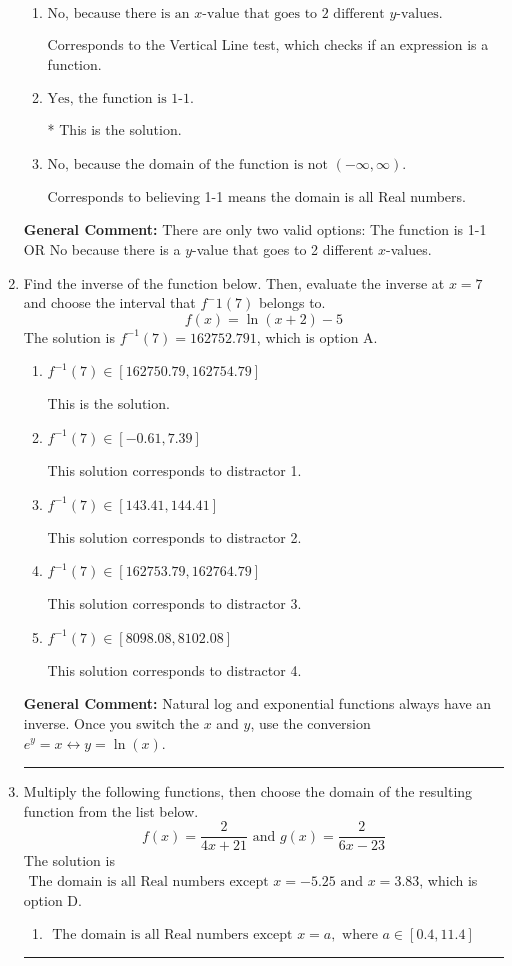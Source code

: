 \documentclass{extbook}[14pt]
\newcommand{\litem}[1]{\item #1

\rule{\textwidth}{0.4pt}}
\begin{document}
\begin{enumerate}
{\begin{enumerate}[label=\Alph*.]
Corresponds to the Horizontal Line test, which this function passes.
\item \( \text{No, because there is an $x$-value that goes to 2 different $y$-values.} \)

Corresponds to the Vertical Line test, which checks if an expression is a function.
\item \( \text{Yes, the function is 1-1.} \)

* This is the solution.
\item \( \text{No, because the domain of the function is not $(-\infty, \infty)$.} \)

Corresponds to believing 1-1 means the domain is all Real numbers.
\end{enumerate}

\textbf{General Comment:} There are only two valid options: The function is 1-1 OR No because there is a $y$-value that goes to 2 different $x$-values.
}
\litem{
Find the inverse of the function below. Then, evaluate the inverse at $x = 7$ and choose the interval that $f^-1(7)$ belongs to.
\[ f(x) = \ln{(x+2)}-5 \]The solution is \( f^{-1}(7) = 162752.791 \), which is option A.\begin{enumerate}[label=\Alph*.]
\item \( f^{-1}(7) \in [162750.79, 162754.79] \)

 This is the solution.
\item \( f^{-1}(7) \in [-0.61, 7.39] \)

 This solution corresponds to distractor 1.
\item \( f^{-1}(7) \in [143.41, 144.41] \)

 This solution corresponds to distractor 2.
\item \( f^{-1}(7) \in [162753.79, 162764.79] \)

 This solution corresponds to distractor 3.
\item \( f^{-1}(7) \in [8098.08, 8102.08] \)

 This solution corresponds to distractor 4.
\end{enumerate}

\textbf{General Comment:} Natural log and exponential functions always have an inverse. Once you switch the $x$ and $y$, use the conversion $ e^y = x \leftrightarrow y=\ln(x)$.
}
\litem{
Multiply the following functions, then choose the domain of the resulting function from the list below.
\[ f(x) = \frac{2}{4x+21} \text{ and } g(x) = \frac{2}{6x-23} \]The solution is \( \text{ The domain is all Real numbers except } x = -5.25 \text{ and } x = 3.83 \), which is option D.\begin{enumerate}[label=\Alph*.]
\item \( \text{ The domain is all Real numbers except } x = a, \text{ where } a \in [0.4, 11.4] \)



\end{enumerate}}
\end{enumerate}
\end{document}
